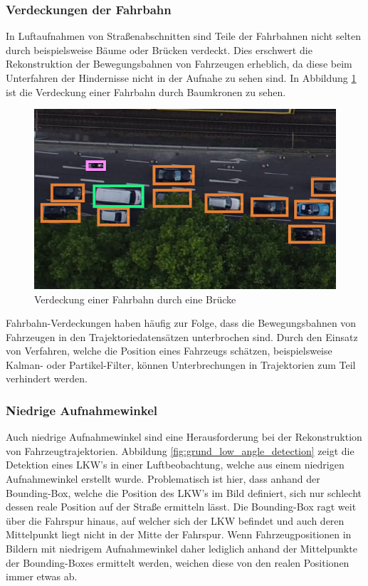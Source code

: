 \subsubsection*{Verdeckungen der Fahrbahn}

In Luftaufnahmen von Straßenabschnitten sind Teile der Fahrbahnen nicht selten durch beispielsweise
Bäume oder Brücken verdeckt. Dies erschwert die Rekonstruktion der Bewegungsbahnen von Fahrzeugen erheblich, da diese
beim Unterfahren der Hindernisse nicht in der Aufnahe zu sehen sind. In Abbildung \ref{fig:grund_lane_occlusion}
ist die Verdeckung einer Fahrbahn durch Baumkronen zu sehen.

\begin{figure}[H]
    \centering
    \includegraphics[width=0.45\linewidth]{resources/img/grundlagen/TrajectoryReconstruction/challenges/Verdeckung}
    \caption[Fahrbahn Verdeckung]{Verdeckung einer Fahrbahn durch eine Brücke}
    \label{fig:grund_lane_occlusion}
\end{figure}

Fahrbahn-Verdeckungen haben häufig zur Folge, dass die Bewegungsbahnen von Fahrzeugen in den
Trajektoriedatensätzen unterbrochen sind.
Durch den Einsatz von Verfahren, welche die Position eines Fahrzeugs schätzen, beispielsweise
Kalman- oder Partikel-Filter, können Unterbrechungen in Trajektorien zum Teil verhindert werden.

\subsubsection*{Niedrige Aufnahmewinkel}

Auch niedrige Aufnahmewinkel sind eine Herausforderung bei der Rekonstruktion von Fahrzeugtrajektorien.
Abbildung \ref{fig:grund_low_angle_detection} zeigt die Detektion eines LKW's in einer Luftbeobachtung,
welche aus einem niedrigen Aufnahmewinkel erstellt wurde. Problematisch ist hier, dass anhand der Bounding-Box,
welche die Position des LKW's im Bild definiert, sich nur schlecht dessen reale Position auf der Straße ermitteln lässt.
Die Bounding-Box ragt weit über die Fahrspur hinaus, auf welcher sich der LKW befindet und auch deren Mittelpunkt
liegt nicht in der Mitte der Fahrspur. Wenn Fahrzeugpositionen in Bildern mit niedrigem Aufnahmewinkel daher lediglich
anhand der Mittelpunkte der Bounding-Boxes ermittelt werden, weichen diese von den realen Positionen immer etwas ab.

